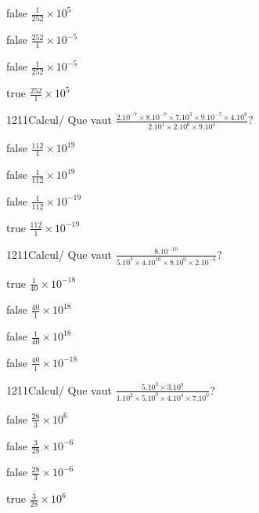             \begin{reponses}
                \item[false] $\frac{1}{252}\times 10^{5}$
                \item[false] $\frac{252}{1}\times 10^{-5}$
                \item[false] $\frac{1}{252}\times 10^{-5}$
                \item[true] $\frac{252}{1}\times 10^{5}$
            \end{reponses}
            \begin{question}{1211}{Calcul}{}{/}
                Que vaut $\frac{2.10^{-7}\times 8.10^{-7}\times 7.10^{3}\times 9.10^{-5}\times 4.10^{8}}{2.10^{1}\times 2.10^{6}\times 9.10^{4}}$?
            \end{question}
            \begin{reponses}
                \item[false] $\frac{112}{1}\times 10^{19}$
                \item[false] $\frac{1}{112}\times 10^{19}$
                \item[false] $\frac{1}{112}\times 10^{-19}$
                \item[true] $\frac{112}{1}\times 10^{-19}$
            \end{reponses}
            \begin{question}{1211}{Calcul}{}{/}
                Que vaut $\frac{8.10^{-10}}{5.10^{4}\times 4.10^{10}\times 8.10^{0}\times 2.10^{-6}}$?
            \end{question}
            \begin{reponses}
                \item[true] $\frac{1}{40}\times 10^{-18}$
                \item[false] $\frac{40}{1}\times 10^{18}$
                \item[false] $\frac{1}{40}\times 10^{18}$
                \item[false] $\frac{40}{1}\times 10^{-18}$
            \end{reponses}
            \begin{question}{1211}{Calcul}{}{/}
                Que vaut $\frac{5.10^{3}\times 3.10^{9}}{1.10^{2}\times 5.10^{0}\times 4.10^{4}\times 7.10^{0}}$?
            \end{question}
            \begin{reponses}
                \item[false] $\frac{28}{3}\times 10^{6}$
                \item[false] $\frac{3}{28}\times 10^{-6}$
                \item[false] $\frac{28}{3}\times 10^{-6}$
                \item[true] $\frac{3}{28}\times 10^{6}$
            \end{reponses}
